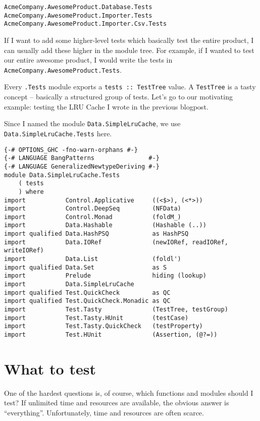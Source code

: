 \begin{verbatim}
AcmeCompany.AwesomeProduct.Database.Tests
AcmeCompany.AwesomeProduct.Importer.Tests
AcmeCompany.AwesomeProduct.Importer.Csv.Tests
\end{verbatim}
If I want to add some higher-level tests which basically test the entire product, I can usually add these higher in the module tree. For example, if I wanted to test our entire awesome product, I would write the tests in \texttt{AcmeCompany.AwesomeProduct.Tests}.

Every \texttt{.Tests} module exports a \texttt{tests :: TestTree} value. A \texttt{TestTree} is a tasty concept -- basically a structured group of tests. Let's go to our motivating example: testing the LRU Cache I wrote in the previous blogpost.

Since I named the module \texttt{Data.SimpleLruCache}, we use \texttt{Data.SimpleLruCache.Tests} here.

\begin{verbatim}
{-# OPTIONS_GHC -fno-warn-orphans #-}
{-# LANGUAGE BangPatterns               #-}
{-# LANGUAGE GeneralizedNewtypeDeriving #-}
module Data.SimpleLruCache.Tests
    ( tests
    ) where
import           Control.Applicative     ((<$>), (<*>))
import           Control.DeepSeq         (NFData)
import           Control.Monad           (foldM_)
import           Data.Hashable           (Hashable (..))
import qualified Data.HashPSQ            as HashPSQ
import           Data.IORef              (newIORef, readIORef, writeIORef)
import           Data.List               (foldl')
import qualified Data.Set                as S
import           Prelude                 hiding (lookup)
import           Data.SimpleLruCache
import qualified Test.QuickCheck         as QC
import qualified Test.QuickCheck.Monadic as QC
import           Test.Tasty              (TestTree, testGroup)
import           Test.Tasty.HUnit        (testCase)
import           Test.Tasty.QuickCheck   (testProperty)
import           Test.HUnit              (Assertion, (@?=))
\end{verbatim}


\section{What to test}


One of the hardest questions is, of course, which functions and modules should I test? If unlimited time and resources are available, the obvious answer is ``everything''. Unfortunately, time and resources are often scarce.

